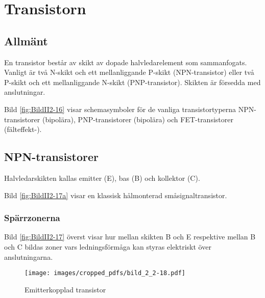 \section{Transistorn}
\label{transistorn}


\subsection{Allmänt}

En transistor består av skikt av dopade halvledarelement som sammanfogats.
Vanligt är två N-skikt och ett mellanliggande P-skikt (NPN-transistor) eller två P-skikt och ett mellanliggande N-skikt (PNP-transistor).
Skikten är försedda med anslutningar.

Bild \ref{fig:BildII2-16} visar schemasymboler för de vanliga tran\-sistor\-typerna 
NPN-transistorer (bipolära), PNP-\-tran\-sistorer (bipolära) och
FET-transistorer (fälteffekt-).

\subsection{NPN-transistorer}

Halvledarskikten kallas emitter (E), bas (B) och kollektor (C).


\noindent
Bild \ref{fig:BildII2-17a} visar en klassisk hålmonterad småsignaltransistor.

\subsubsection{Spärrzonerna}


Bild \ref{fig:BildII2-17} överst visar hur mellan skikten B och E respektive mellan B och C bildas zoner vars ledningsförmåga kan styras elektriskt över anslutningarna.

\begin{figure*}[p]
  \begin{center}
    \texttt{[image: images/cropped\_pdfs/bild\_2\_2-18.pdf]}
    \caption{Emitterkopplad transistor}
    \label{fig:BildII2-18}
  \end{center}
\end{figure*}

